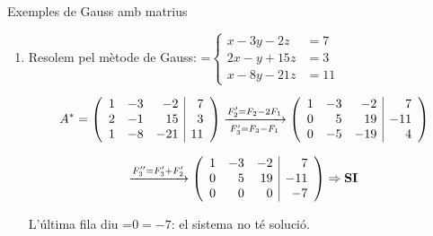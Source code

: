 \documentclass[11pt,a4paper]{article}
\newcommand{\fmm}[1]{\setbox0=\hbox{$#1$}\ifdim\wd0>\linewidth\fmdisp{#1}\else\mbox{\box0}\fi}
\newcommand{\fmdisp}[1]{\[\setbox2=\hbox{$\displaystyle #1$}\ifdim\wd2>\linewidth\resizebox{\linewidth}{!}{\box2}\else\box2\fi\]}
\begin{document}
\begin{fmex}{Exemples de Gauss amb matrius}
\begin{enumerate}[label=\textbf{\arabic*.},leftmargin=*]
\fmdisp{\xrightarrow{F_3''=-2F_3'+F_2'}\left(\begin{array}{rrr|r}1 & -3 & 7 & 10\\ 0 & 14 & -34 & -42\\ 0 & 0 & 0 & 0\end{array}\right)\Rightarrow\textbf{SCI}}

Donem la solució general del sistema. Fem \fmm{z=\lambda} (i simplifiquem la segona fila entre 2):

\fmdisp{7y-17\lambda=-21\rightarrow y=\frac{17\lambda-21}{7}=-3+\frac{17}{7}\lambda}

\fmdisp{x-3y+7\lambda=10\rightarrow x=10+3\left(-3+\tfrac{17}{7}\lambda\right)-7\lambda=1+\frac{2}{7}\lambda}

\fmdisp{\boxed{x=1+\tfrac{2}{7}\lambda;\ \ y=-3+\tfrac{17}{7}\lambda;\ \ z=\lambda,\quad\lambda\in\mathbb{R}}}

També la podem expressar així (canviant \fmm{\lambda} per \fmm{7\lambda}): \fmm{x=1+2\lambda;\ y=-3+17\lambda;\ z=7\lambda,\ \lambda\in\mathbb{R}}
\item Resolem pel mètode de Gauss: \fmm{\left\{\begin{aligned}x-3y-2z&=7\\ 2x-y+15z&=3\\ x-8y-21z&=11\end{aligned}\right.}

\fmdisp{A^*=\left(\begin{array}{rrr|r}1 & -3 & -2 & 7\\ 2 & -1 & 15 & 3\\ 1 & -8 & -21 & 11\end{array}\right)\xrightarrow[F_3'=F_3-F_1]{F_2'=F_2-2F_1}\left(\begin{array}{rrr|r}1 & -3 & -2 & 7\\ 0 & 5 & 19 & -11\\ 0 & -5 & -19 & 4\end{array}\right)}

\fmdisp{\xrightarrow{F_3''=F_3'+F_2'}\left(\begin{array}{rrr|r}1 & -3 & -2 & 7\\ 0 & 5 & 19 & -11\\ 0 & 0 & 0 & -7\end{array}\right)\Rightarrow\textbf{SI}}

L'última fila diu \fmm{0=-7}: el sistema no té solució.
\end{enumerate}
\end{fmex}
\end{document}
